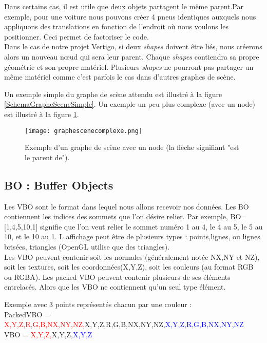 \documentclass[11pt]{report}
\begin{document}
Dans certains cas, il est utile que deux objets partagent le même parent.Par exemple, pour une voiture nous pouvons créer 4 pneus identiques auxquels nous appliquons des translations en fonction de l'endroit où nous voulons les positionner. Ceci permet de factoriser le code.\\

Dans le cas de notre projet Vertigo, si deux \textit{shapes} doivent être liés, nous créerons alors un nouveau nœud qui sera leur parent. Chaque \textit{shapes} contiendra sa propre géométrie et son propre matériel. Plusieurs \textit{shapes} ne pourront pas partager un même matériel comme c'est parfois le cas dans d'autres graphes de scène.

Un exemple simple du graphe de scène attendu est illustré à la figure \ref{SchemaGrapheSceneSimple}. Un exemple un peu plus complexe (avec un node) est illustré à la figure \ref{graphescenecomplexe}.

\begin{figure}[h!]
  \caption{Exemple d'un graphe de scène avec un node (la flèche signifiant "est le parent de").}
  \centering
\texttt{[image: graphescenecomplexe.png]} 
\label{graphescenecomplexe}
\end{figure}


\subsection{BO : Buffer Objects} 
\label{VBO}%
Les VBO sont le format dans lequel nous allons recevoir nos données. 
Les BO contiennent les indices des sommets que l'on désire relier. Par exemple, BO=[1,4,5,10,1] signifie que l'on veut relier le sommet numéro 1 au 4, le 4 au 5, le 5 au 10, et le 10 au 1. 
 L affichage peut être de plusieurs types : points,lignes, ou lignes  brisées, triangles (OpenGL utilise que des triangles).\\
 
 Les VBO peuvent contenir soit les normales (généralement notée NX,NY et NZ), soit les textures, soit les coordonnées(X,Y,Z), soit les couleurs (au format RGB ou RGBA).
 Les packed VBO peuvent contenir plusieurs de ses éléments entrelacés. Alors que les VBO ne contiennent qu'un seul type élément.
 
 Exemple avec 3 points représentés chacun par une couleur : \\
 PackedVBO = \textcolor{red} {X,Y,Z,R,G,B,NX,NY,NZ,}\textcolor{dgreen}{X,Y,Z,R,G,B,NX,NY,NZ,}\textcolor{blue}{X,Y,Z,R,G,B,NX,NY,NZ}\\
 VBO = \textcolor{red}{X,Y,Z,}\textcolor{dgreen}{X,Y,Z,}\textcolor{blue}{X,Y,Z} \\
 
\end{document}
